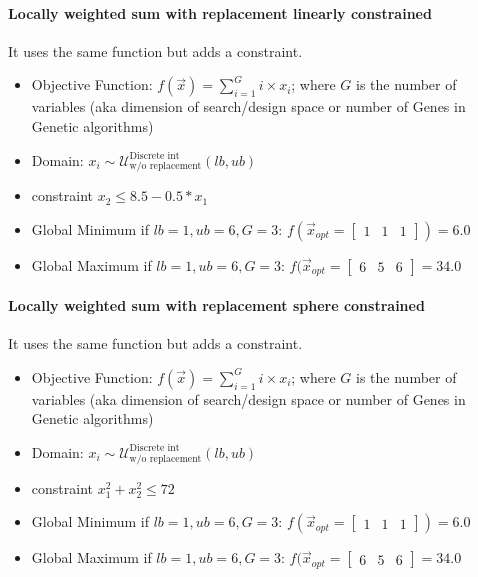 \paragraph{Locally weighted sum with replacement linearly constrained}
It uses the same function but adds a constraint.
\begin{itemize}
	\item Objective Function: $f(\vec{x}) = \sum_{i=1}^{G}i \times x_i$; where $G$ is the number of variables (aka dimension of search/design space or number of Genes in Genetic algorithms)
	\item Domain: $x_i \sim \mathcal{U}^{\text{Discrete int}}_{\text{w/o replacement}} (lb,ub)$
	\item constraint $x_2 \leq 8.5 - 0.5 * x_1$
	\item Global Minimum if $lb = 1, ub = 6, G =3$: $f(\vec{x}_{opt} = \begin{bmatrix}
	1 & 1 & 1 \end{bmatrix}) = 6.0$
	\item Global Maximum if $lb = 1, ub = 6, G =3$: $f(\vec{x}_{opt} = \begin{bmatrix}
	6 & 5 & 6 \end{bmatrix} = 34.0$
\end{itemize}

\paragraph{Locally weighted sum with replacement sphere constrained}
It uses the same function but adds a constraint.
\begin{itemize}
	\item Objective Function: $f(\vec{x}) = \sum_{i=1}^{G}i \times x_i$; where $G$ is the number of variables (aka dimension of search/design space or number of Genes in Genetic algorithms)
	\item Domain: $x_i \sim \mathcal{U}^{\text{Discrete int}}_{\text{w/o replacement}} (lb,ub)$
	\item constraint $x^{2}_{1} + x^{2}_{2} \leq 72$
	\item Global Minimum if $lb = 1, ub = 6, G =3$: $f(\vec{x}_{opt} = \begin{bmatrix}
1 & 1 & 1 \end{bmatrix})= 6.0$
\item Global Maximum if $lb = 1, ub = 6, G =3$: $f(\vec{x}_{opt} = \begin{bmatrix}
6 & 5 & 6 \end{bmatrix} = 34.0$
\end{itemize}
